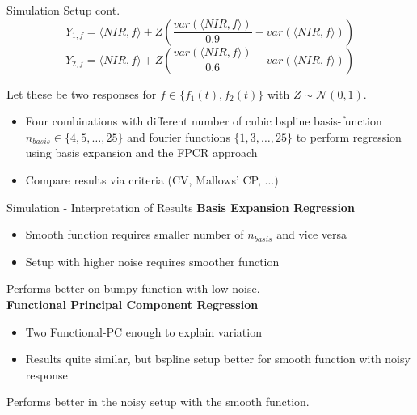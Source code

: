 \documentclass{beamer}
\begin{document}
	
	\begin{frame}{Simulation Setup cont.}
		$$Y_{1,f} = \langle NIR, f\rangle + Z\left(  \frac{var(\langle NIR, f\rangle)}{0.9} - var(\langle NIR, f\rangle)\right)$$ 
		$$Y_{2,f} = \langle NIR, f\rangle + Z\left( \frac{var(\langle NIR, f\rangle)}{0.6} - var(\langle NIR, f\rangle)\right)$$
		
		Let these be two responses for $f \in \{f_1(t), f_2(t)\}$ with $Z \sim \mathcal{N}(0,1)$.	
		\vspace{0.2cm}
		
		\begin{itemize}
    		\item Four combinations with different number of cubic bspline basis-function $n_{basis} \in \{4,5, \dots ,25\}$ and fourier functions $\{1,3, \dots, 25\}$ to perform regression using basis expansion and the FPCR approach
			\item Compare results via criteria (CV, Mallows' CP, ...)
		
		\end{itemize}
	\end{frame}
	
	\begin{frame}{Simulation - Interpretation of Results}\label{Results}
		\textbf{Basis Expansion Regression}
		\begin{itemize}
    			\item Smooth function requires smaller number of $n_{basis}$ and vice versa
    			\item Setup with higher noise requires smoother function
    			
		\end{itemize}
		 	
		Performs better on bumpy function with low noise.\\
	\vspace{0.4cm}
		\textbf{Functional Principal Component Regression}
    	\begin{itemize}
    		\item Two Functional-PC enough to explain variation
    		\item Results quite similar, but bspline setup better for smooth function with noisy response
    		
    	\end{itemize}
    	 
    	Performs better in the noisy setup with the smooth function.\\
    	\vspace{0.4cm}
    

    	
    	\hyperlink{Simulation}{}
    	\hyperlink{Simulation2}{}
	\end{frame}
\end{document}

